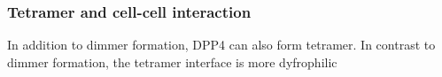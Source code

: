 \subsubsection{Tetramer and cell-cell interaction}

In addition to dimmer formation, DPP4 can also form tetramer. In contrast to dimmer formation, the tetramer interface is more dyfrophilic 